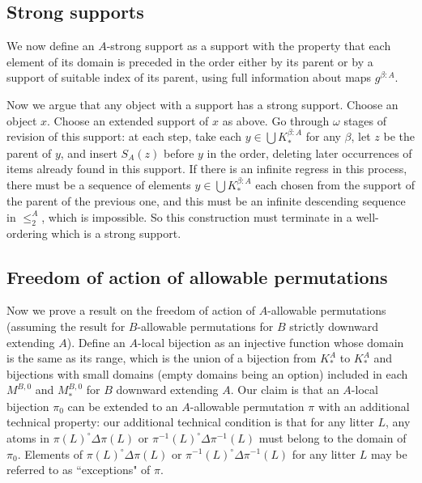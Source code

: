 \documentclass[12pt]{article}
\begin{document}
\subsection{Strong supports}

We now define an $A$-strong support as a support with the property that each element of its domain is preceded in the order either by its parent or by a support of suitable index of its parent, using full information about maps $g^{\beta:A}$.

Now we argue that any object with a support has a strong support.   Choose an object $x$.  Choose an extended support of $x$ as above.  Go through $\omega$ stages of revision
of this support:  at each step, take each $y \in \bigcup K^{\beta:A}_*$ for any $\beta$, let $z$ be the parent of $y$, and insert $S_A(z)$ before $y$ in the order, deleting later occurrences of items already found in this support.  If there is an infinite regress in this process, there must be a sequence of elements $y \in \bigcup K^{\beta:A}_*$ each chosen from the support of the
parent of the previous one, and this must be an infinite descending sequence in $\leq^A_2$, which is impossible.  So this construction must terminate in a well-ordering which is a strong support.

\subsection{Freedom of action of allowable permutations}


Now we prove a result on the freedom of action of $A$-allowable permutations (assuming the result for $B$-allowable permutations for $B$ strictly downward extending $A$).
Define an $A$-local bijection as an injective function whose domain is the same as its range, which is the union of a bijection from $K^A_*$ to $K^A_*$ and
bijections with small domains (empty domains being an option) included in each $M^{B,0}$ and $M_*^{B,0}$ for $B$ downward extending $A$.
Our claim is that an $A$-local bijection $\pi_0$ can be extended to an $A$-allowable permutation $\pi$ with an additional technical property:  our additional technical condition is that for any litter $L$, any atoms in  $\pi(L)^{\circ} \Delta \pi(L)$ or $\pi^{-1}(L)^{\circ} \Delta \pi^{-1}(L)$ must belong to the domain of $\pi_0$.   Elements of $\pi(L)^{\circ} \Delta \pi(L)$ or $\pi^{-1}(L)^{\circ} \Delta \pi^{-1}(L)$ for any litter $L$ may be referred to as ``exceptions" of $\pi$.
\end{document}
